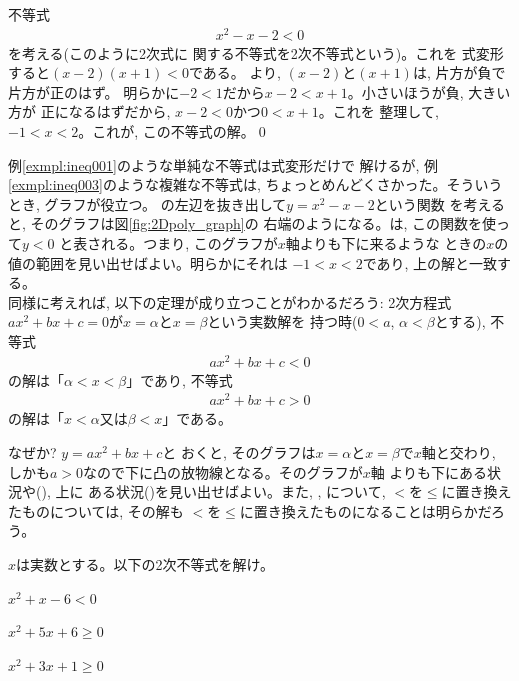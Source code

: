 \begin{exmpl}\label{exmpl:ineq003} 不等式
\begin{eqnarray}
x^2-x-2<0\label{eq:x2_x_2le0}
\end{eqnarray}
を考える(このように2次式に
関する不等式を2次不等式という)。これを
式変形すると$(x-2)(x+1)<0$である。
より, $(x-2)$と$(x+1)$は, 片方が負で片方が正のはず。
明らかに$-2<1$だから$x-2<x+1$。小さいほうが負, 大きい方が
正になるはずだから, $x-2<0$かつ$0<x+1$。これを
整理して, $-1<x<2$。これが, この不等式の解。\qed\end{exmpl}

例\ref{exmpl:ineq001}のような単純な不等式は式変形だけで
解けるが, 例\ref{exmpl:ineq003}のような複雑な不等式は, 
ちょっとめんどくさかった。そういうとき, グラフが役立つ。
の左辺を抜き出して$y=x^2-x-2$という関数
を考えると, そのグラフは図\ref{fig:2Dpoly_graph}の
右端のようになる。は, この関数を使って$y<0$
と表される。つまり, このグラフが$x$軸よりも下に来るような
ときの$x$の値の範囲を見い出せばよい。明らかにそれは
$-1<x<2$であり, 上の解と一致する。\\

同様に考えれば, 以下の定理が成り立つことがわかるだろう: 
2次方程式$ax^2+bx+c=0$が$x=\alpha$と$x=\beta$という実数解を
持つ時($0<a$, $\alpha<\beta$とする), 不等式
\begin{eqnarray}
ax^2+bx+c<0\label{eq:alg_2ineq_1}
\end{eqnarray}
の解は「$\alpha<x<\beta$」であり, 不等式
\begin{eqnarray}
ax^2+bx+c>0\label{eq:alg_2ineq_2}
\end{eqnarray}
の解は「$x<\alpha$又は$\beta<x$」である。

なぜか? $y=ax^2+bx+c$と
おくと, そのグラフは$x=\alpha$と$x=\beta$で$x$軸と交わり, 
しかも$a>0$なので下に凸の放物線となる。そのグラフが$x$軸
よりも下にある状況や(), 上に
ある状況()を見い出せばよい。また, 
, について, 
$<$を$\leq$に置き換えたものについては, その解も
$<$を$\leq$に置き換えたものになることは明らかだろう。

\begin{q}\label{q:alg_ineq1} $x$は実数とする。以下の2次不等式を解け。
\begin{edaenumerate}
\item $x^2+x-6<0$
\item $x^2+5x+6\geq 0$
\item $x^2+3x+1\geq 0$
\end{edaenumerate}
\end{q}

